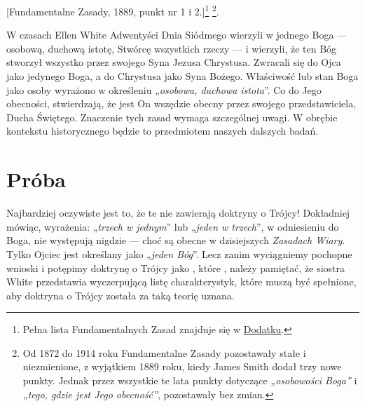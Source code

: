 
[Fundamentalne Zasady, 1889, punkt nr 1 i 2.]\footnote{Pełna lista Fundamentalnych Zasad znajduje się w \hyperref[chap:appendix]{Dodatku}.} \footnote{Od 1872 do 1914 roku Fundamentalne Zasady pozostawały stałe i niezmienione, z wyjątkiem 1889 roku, kiedy James Smith dodał trzy nowe punkty. Jednak przez wszystkie te lata punkty dotyczące \textit{„osobowości Boga”} i \textit{„tego, gdzie jest Jego obecność”}, pozostawały bez zmian.}.

W czasach Ellen White Adwentyści Dnia Siódmego wierzyli w jednego Boga — osobową, duchową istotę, Stwórcę wszystkich rzeczy — i wierzyli, że ten Bóg stworzył wszystko przez swojego Syna Jezusa Chrystusa. Zwracali się do Ojca jako jedynego Boga, a do Chrystusa jako Syna Bożego. Właściwość lub stan Boga jako osoby wyrażono w określeniu „\textit{osobowa, duchowa istota}”. Co do Jego obecności,  stwierdzają, że jest On wszędzie obecny przez swojego przedstawiciela, Ducha Świętego. Znaczenie tych zasad wymaga szczególnej uwagi. W obrębie kontekstu historycznego będzie to przedmiotem naszych dalszych badań.

\section*{Próba}

Najbardziej oczywiste jest to, że te  nie zawierają doktryny o Trójcy! Dokładniej mówiąc, wyrażenia: „\textit{trzech w jednym}” lub „\textit{jeden w trzech}”, w odniesieniu do Boga, nie występują nigdzie — choć są obecne w dzisiejszych \textit{Zasadach Wiary}. Tylko Ojciec jest określany jako „\textit{jeden Bóg}”. Lecz zanim wyciągniemy pochopne wnioski i potępimy doktrynę o Trójcy jako , które , należy pamiętać, że siostra White przedstawia wyczerpującą listę charakterystyk, które muszą być spełnione, aby doktryna o Trójcy została za taką teorię uznana.

